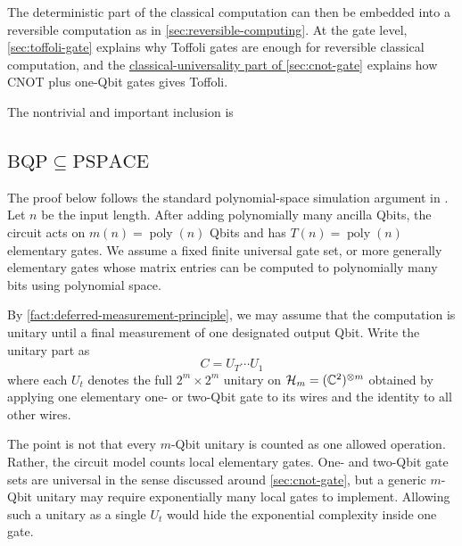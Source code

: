 The deterministic part of the classical computation can then be embedded into a reversible computation as in \autoref{sec:reversible-computing}.
At the gate level, \autoref{sec:toffoli-gate} explains why Toffoli gates are enough for reversible classical computation, and the \hyperref[sec:cnot-classical-universality]{classical-universality part of \autoref{sec:cnot-gate}} explains how CNOT plus one-Qbit gates gives Toffoli.

\medskip



The nontrivial and important inclusion is %

\subsection{\texorpdfstring{\(\mathrm{BQP}\subseteq\mathrm{PSPACE}\)}{BQP subset PSPACE}}\label{sec:bqp-subset-pspace}

The proof below follows the standard polynomial-space simulation argument in \cite{nielsenChuangQCQI}.
Let \(n\) be the input length.
After adding polynomially many ancilla Qbits, the circuit acts on \(m(n)=\operatorname{poly}(n)\) Qbits and has \(T(n)=\operatorname{poly}(n)\) elementary gates.
We assume a fixed finite universal gate set, or more generally elementary gates whose matrix entries can be computed to polynomially many bits using polynomial space.

By \autoref{fact:deferred-measurement-principle}, we may assume that the computation is unitary until a final measurement of one designated output Qbit.
Write the unitary part as
\[
C
=
U_T \cdots U_1
\]
where each \(U_t\) denotes the full \(2^m\times2^m\) unitary on
\(
\mathcal H_m=(\mathbb{C}^2)^{\otimes m}
\)
obtained by applying one elementary one- or two-Qbit gate to its wires and the identity to all other wires. %

The point is not that every \(m\)-Qbit unitary is counted as one allowed operation.
Rather, the circuit model counts local elementary gates.
One- and two-Qbit gate sets are universal in the sense discussed around \autoref{sec:cnot-gate}, but a generic \(m\)-Qbit unitary may require exponentially many local gates to implement.
Allowing such a unitary as a single \(U_t\) would hide the exponential complexity inside one gate.

